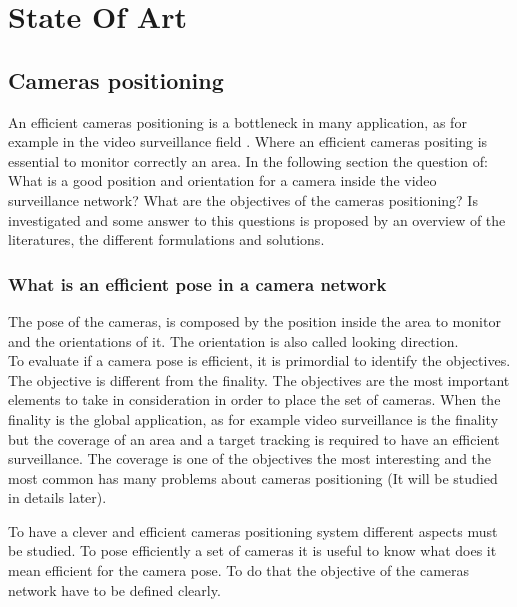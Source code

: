 \chapter{State Of Art}\label{chap:stateOfTheArt}

\minitoc


\section{Cameras positioning }\label{sec:camerasPositioning}
An efficient cameras positioning is a bottleneck in many application, as for example in the video surveillance field \cite{11*herrera2012,12*soto2009,18*ding2012,151*zhao2013,84*xu2011}. Where an efficient cameras positing is essential to monitor correctly an area.  
In the following section the question of: 
What is a good position and orientation for a camera inside the video surveillance network?
What are the objectives of the cameras positioning?
Is investigated and  some answer to this questions is proposed by an overview of the literatures, the different formulations and solutions. 


\subsection{What is an efficient pose in a camera network}
The pose of the cameras,  is composed by the position inside the area to monitor and the orientations of it. The orientation is also called looking direction.\\ 
To evaluate if a camera  pose is efficient, it is primordial to identify the objectives. The objective is different from the finality. The objectives are the most important elements to take in consideration in order to place the set of cameras. When the finality is the global application, as for example video surveillance is the finality but the coverage of an area and a target tracking  is required to have an efficient surveillance.  The coverage is one of the objectives the most interesting and the most common has many problems about cameras positioning (It will be studied in details later).


To have a clever and efficient cameras positioning system different aspects must be studied. To pose efficiently a set of cameras it is useful to know what does it mean efficient  for  the  camera pose. To do that the objective of the cameras network have to be defined clearly. 

